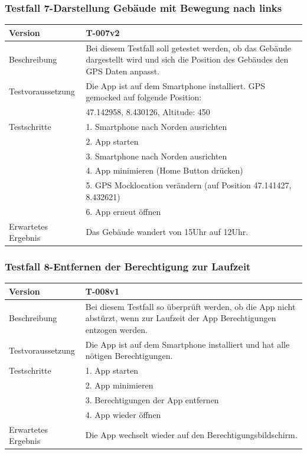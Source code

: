 \documentclass[a4paper]{scrreprt}
\begin{document}
\subsubsection{Testfall 7-Darstellung Gebäude mit Bewegung nach links}
\begin{tabularx}{\textwidth}{|l|X|}
\hline
	Version &
	T-007v2 \\
\hline
	Beschreibung &
	Bei diesem Testfall soll getestet werden, ob das Gebäude dargestellt wird und sich die Position des Gebäudes den GPS Daten anpasst. \\
\hline
	Testvoraussetzung &
	Die App ist auf dem Smartphone installiert. GPS gemocked auf folgende Position: \\ &
		47.142958, 8.430126, Altitude: 450 \\ 
\hline 
	Testschritte & 
		1. Smartphone nach Norden ausrichten\\ &
		2. App starten\\ &
		3. Smartphone nach Norden ausrichten\\ &
		4. App minimieren (Home Button drücken)\\ &
		5. GPS Mocklocation verändern (auf Position  47.141427, 8.432621)\\ &
		6. App erneut öffnen\\
\hline
	Erwartetes Ergebnis &
	Das Gebäude wandert von 15Uhr auf 12Uhr. \\ 
\hline 
\end{tabularx}
\subsubsection{Testfall 8-Entfernen der Berechtigung zur Laufzeit}
\begin{tabularx}{\textwidth}{|l|X|}
\hline
	Version &
	T-008v1 \\ 
\hline 
	Beschreibung & 
	Bei diesem Testfall so überprüft werden, ob die App nicht abstürzt, wenn zur Laufzeit der App Berechtigungen entzogen werden. \\ 
\hline 
	Testvoraussetzung &
	Die App ist auf dem Smartphone installiert und hat alle nötigen Berechtigungen. \\ 
\hline 
	Testschritte & 
		1. App starten\\ &
		2. App minimieren\\ &
		3. Berechtigungen der App entfernen\\ &
		4. App wieder öffnen\\
\hline
	Erwartetes Ergebnis &
	Die App wechselt wieder auf den Berechtigungsbildschirm. \\
\hline
\end{tabularx}
\end{document}
